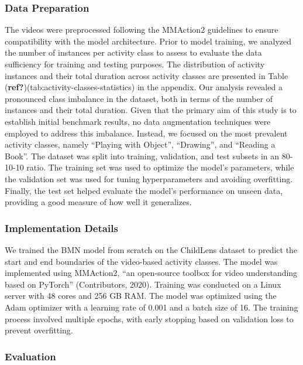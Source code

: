 \documentclass[
  man,floatsintext]{apa6}
\begin{document}
\subsubsection{Data Preparation}\label{data-preparation}

The videos were preprocessed following the MMAction2 guidelines to ensure compatibility with the model architecture. Prior to model training, we analyzed the number of instances per activity class to assess to evaluate the data sufficiency for training and testing purposes. The distribution of activity instances and their total duration across activity classes are presented in Table (\textbf{ref?})(tab:activity-classes-statistics) in the appendix.
Our analysis revealed a pronounced class imbalance in the dataset, both in terms of the number of instances and their total duration. Given that the primary aim of this study is to establish initial benchmark results, no data augmentation techniques were employed to address this imbalance. Instead, we focused on the most prevalent activity classes, namely ``Playing with Object'', ``Drawing'', and ``Reading a Book''. The dataset was split into training, validation, and test subsets in an 80-10-10 ratio. The training set was used to optimize the model's parameters, while the validation set was used for tuning hyperparameters and avoiding overfitting. Finally, the test set helped evaluate the model's performance on unseen data, providing a good measure of how well it generalizes.

\subsubsection{Implementation Details}\label{implementation-details}

We trained the BMN model from scratch on the ChildLens dataset to predict the start and end boundaries of the video-based activity classes. The model was implemented using MMAction2, ``an open-source toolbox for video understanding based on PyTorch'' (Contributors, 2020). Training was conducted on a Linux server with 48 cores and 256 GB RAM. The model was optimized using the Adam optimizer with a learning rate of 0.001 and a batch size of 16. The training process involved multiple epochs, with early stopping based on validation loss to prevent overfitting.

\subsubsection{Evaluation}\label{evaluation}
\end{document}
